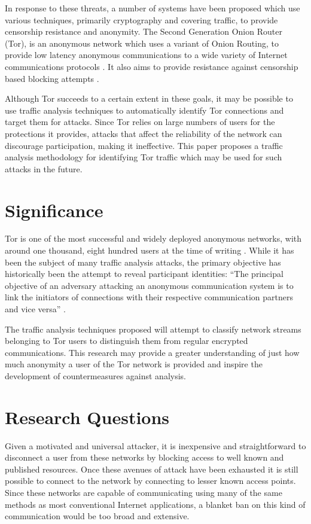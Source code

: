 \documentclass{ecuthesis}
\begin{document}
In response to these threats, a number of systems have been proposed which use
various techniques, primarily cryptography and covering traffic, to provide
censorship resistance and anonymity. The Second Generation Onion Router (Tor),
is an anonymous network which uses a variant of Onion Routing, to provide low
latency anonymous communications to a wide variety of Internet communications
protocols \parencite{Dingledine:2004p314}. It also aims to provide resistance
against censorship based blocking attempts \parencite{Dingledine:2008p1542}.

Although Tor succeeds to a certain extent in these goals, it may be possible to
use traffic analysis techniques to automatically identify Tor connections and
target them for attacks. Since Tor relies on large numbers of users for the
protections it provides, attacks that affect the reliability of the network can
discourage participation, making it ineffective. This paper proposes a traffic
analysis methodology for identifying Tor traffic which may be used for such
attacks in the future.

\section{Significance}

Tor is one of the most successful and widely deployed anonymous networks, with
around one thousand, eight hundred users at the time of writing
\parencite{website:tor-anonymity-online}. While it has been the subject of many
traffic analysis attacks, the primary objective has historically been the
attempt to reveal participant identities: ``The principal objective of an
adversary attacking an anonymous communication system is to link the initiators
of connections with their respective communication partners and vice versa''
\parencite[3]{Murdoch:2005p325}.

The traffic analysis techniques proposed will attempt to classify network
streams belonging to Tor users to distinguish them from regular encrypted
communications. This research may provide a greater understanding of just
how much anonymity a user of the Tor network is provided and inspire
the development of countermeasures against analysis.

\section{Research Questions}

Given a motivated and universal attacker, it is inexpensive and straightforward
to disconnect a user from these networks by blocking access to well known and
published resources. Once these avenues of attack have been exhausted it is
still possible to connect to the network by connecting to lesser known access
points. Since these networks are capable of communicating using many of the
same methods as most conventional Internet applications, a blanket ban on this
kind of communication would be too broad and extensive.
\end{document}

